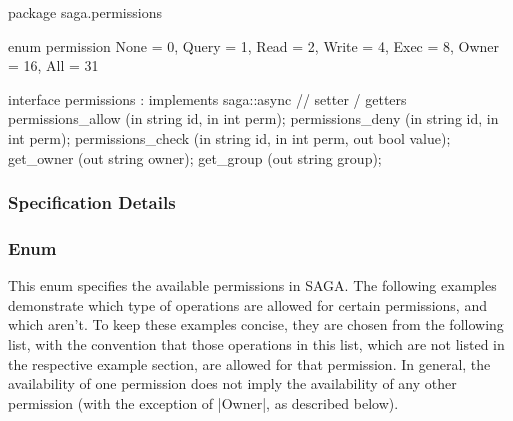  \begin{myspec}
  package saga.permissions
  {
    enum permission
    {
      None      =  0,
      Query     =  1,
      Read      =  2,
      Write     =  4,
      Exec      =  8,
      Owner     = 16,
      All       = 31
    }
 
    interface permissions : implements saga::async
    {
      // setter / getters
      permissions_allow       (in  string          id,
                               in  int             perm);
      permissions_deny        (in  string          id,
                               in  int             perm);
      permissions_check       (in  string          id,
                               in  int             perm,
                               out bool            value);
      get_owner               (out string          owner);
      get_group               (out string          group);
    }
  }
 \end{myspec}
 
 
 \subsubsection{Specification Details}
 
 \subsubsection*{Enum }
 
  This enum specifies the available permissions in SAGA.  The
  following examples demonstrate which type of operations are
  allowed for certain permissions, and which aren't.  To keep
  these examples concise, they are chosen from the following
  list, with the convention that those operations in this list,
  which are not listed in the respective example section, are
   allowed for that permission.  In general, the
  availability of one permission does not imply the availability
  of any other permission (with the exception of |Owner|, as
  described below).
 

